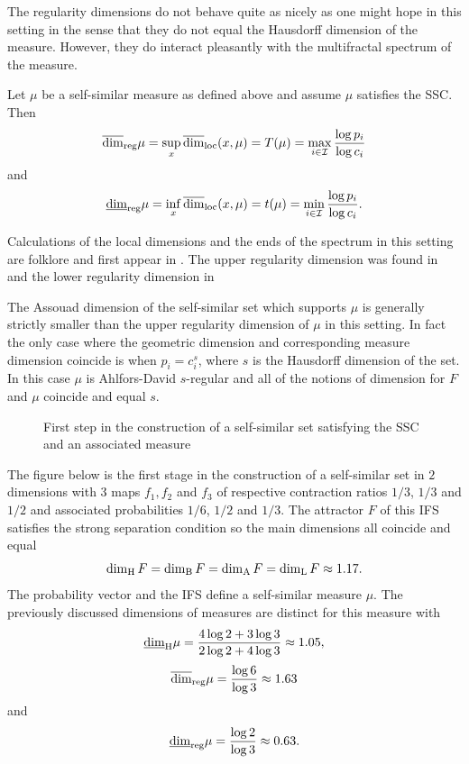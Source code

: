 The regularity dimensions do not behave quite as nicely as one might hope in this setting in the sense that they do not equal the Hausdorff dimension of the measure. However, they do interact pleasantly with the multifractal spectrum of the measure.

\begin{theorem}\label{ch-upper-reg:selfsimilar}
	Let $\mu$ be a self-similar measure as defined above and assume $\mu$ satisfies the SSC.  Then 
	\[
	\overline{\dim}_{\textup{reg}} \mu = \sup_x \overline{\dim}_{\textup{loc}}(x,\mu) = T(\mu) = \max_{i \in \mathcal{I}} \frac{\log p_i}{\log c_i}
	\]
	and 
	\[
	\underline{\dim}_{\textup{reg}} \mu = \inf_x \overline{\dim}_{\textup{loc}}(x,\mu) = t(\mu) = \min_{i \in \mathcal{I}} \frac{\log p_i}{\log c_i}.
	\]
\end{theorem}

Calculations of the local dimensions and the ends of the spectrum in this setting are folklore and first appear in \cite{cawley-mauldin}. The upper regularity dimension was found in \cite{fraser-howroyd2} and the lower regularity dimension in \cite{hare-troscheit}

The Assouad dimension of the self-similar set which supports $\mu$ is generally strictly smaller than the upper regularity dimension of $\mu$ in this setting.  In fact the only case where the geometric dimension and corresponding measure dimension coincide is when  $p_i=c_i^s$, where $s$ is the Hausdorff dimension of the set. In this case $\mu$ is Ahlfors-David $s$-regular and all of the notions of dimension for $F$ and $\mu$ coincide and equal $s$.

\begin{figure}[htb]
    \centering
    \caption{First step in the construction of a self-similar set satisfying the SSC and an associated measure}
    \label{fig:ex-self-sim}
\end{figure}



The figure below is the first stage in the construction of a self-similar set in $2$ dimensions with 3 maps $f_1, f_2$ and $f_3$ of respective contraction ratios $1/3$, $1/3$ and $1/2$ and associated probabilities $1/6$, $1/2$ and $1/3$. The attractor $F$ of this IFS satisfies the strong separation condition so the main dimensions all coincide and equal
\[
\dim_{\text{H}} F = \dim_\textup{B} F = \dim_{\textup{A}} F = \dim_{\textup{L}} F \approx 1.17.
\]
The probability vector and the IFS define a self-similar measure $\mu$. The previously discussed dimensions of measures are distinct for this measure with
\[
\underline{\dim}_{\text{H}} \mu = \frac{4 \log 2 + 3 \log 3}{2 \log 2 + 4 \log 3} \approx 1.05,
\]
\[
\overline{\dim}_{\textup{reg}} \mu = \frac{\log 6}{\log 3} \approx 1.63
\]
and 
\[
\underline{\dim}_{\textup{reg}} \mu = \frac{\log 2}{\log 3} \approx 0.63.
\]


